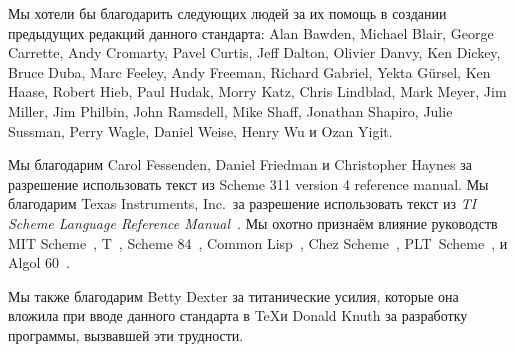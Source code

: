 Мы хотели бы благодарить следующих людей за их помощь в создании предыдущих редакций данного
стандарта: Alan Bawden, Michael Blair, George Carrette, Andy Cromarty, Pavel Curtis, Jeff
Dalton, Olivier Danvy, Ken Dickey, Bruce Duba, Marc Feeley, Andy Freeman, Richard Gabriel, Yekta
G\"ursel, Ken Haase, Robert Hieb, Paul Hudak, Morry Katz, Chris Lindblad, Mark Meyer, Jim
Miller, Jim Philbin, John Ramsdell, Mike Shaff, Jonathan Shapiro, Julie Sussman, Perry Wagle,
Daniel Weise, Henry Wu и Ozan Yigit.\vspace{4mm}

Мы благодарим Carol Fessenden, Daniel
Friedman и Christopher Haynes за разрешение использовать текст из Scheme 311
version 4 reference manual.  Мы благодарим Texas Instruments, Inc.~за разрешение
использовать текст из {\em TI Scheme Language Reference Manual}~\cite{TImanual85}.
Мы охотно признаём влияние руководств MIT Scheme~\cite{MITScheme},
T~\cite{Rees84}, Scheme 84~\cite{Scheme84}, Common Lisp~\cite{CLtL},
Chez Scheme~\cite{csug7}, PLT~Scheme~\cite{mzscheme352},
и Algol 60~\cite{Naur63}.\vspace{4mm}

\vest Мы также благодарим Betty Dexter за титанические усилия, которые она вложила при
вводе данного стандарта в \TeX и Donald Knuth за разработку программы,
вызвавшей эти трудности.\vspace{4mm}

